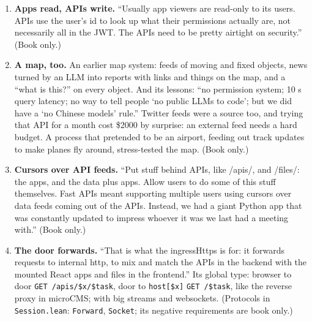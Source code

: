 \begin{enumerate}
  hits carry their context and their position, such as forty seconds into a
  video. And what the audience really thinks: ``upload a whole bunch of security
  cameras; let AIs put vtt on it''. (Book only.)
\item \textbf{Apps read, APIs write.} ``Usually app viewers are read-only to its
  users. APIs use the user's id to look up what their permissions actually are,
  not necessarily all in the JWT. The APIs need to be pretty airtight on
  security.'' (Book only.)
\item \textbf{A map, too.} An earlier map system: feeds of moving and fixed objects,
  news turned by an LLM into reports with links and things on the map, and a
  ``what is this?'' on every object. And its lessons: ``no permission system;
  10 s query latency; no way to tell people `no public LLMs to code'; but we did
  have a `no Chinese models' rule.'' Twitter feeds were a source too, and trying
  that API for a month cost \$2000 by surprise: an external feed needs a hard
  budget. A process that pretended to be an airport, feeding out track updates to
  make planes fly around, stress-tested the map. (Book only.)
\item \textbf{Cursors over API feeds.} ``Put stuff behind APIs, like /apis/, and
  /files/: the apps, and the data plus apps. Allow users to do some of this stuff
  themselves. Fast APIs meant supporting multiple users using cursors over data
  feeds coming out of the APIs. Instead, we had a giant Python app that was
  constantly updated to impress whoever it was we last had a meeting with.''
  (Book only.)
\item \textbf{The door forwards.} ``That is what the ingressHttps is for: it
  forwards requests to internal http, to mix and match the APIs in the backend
  with the mounted React apps and files in the frontend.'' Its global type: browser
  to door \texttt{GET /apis/\$x/\$task}, door to \texttt{host[\$x]} \texttt{GET
  /\$task}, like the reverse proxy in microCMS; with big streams and websockets.
  (Protocols in \texttt{Session.lean}: \texttt{Forward}, \texttt{Socket}; its
  negative requirements are book only.)
\end{enumerate}

